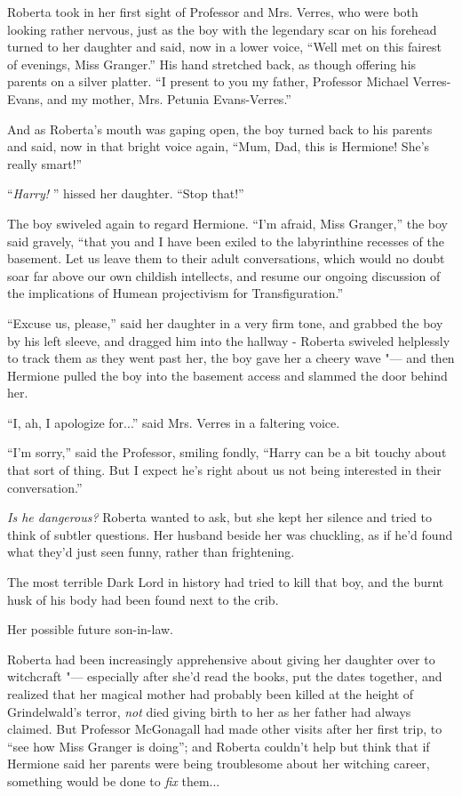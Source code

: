 Roberta took in her first sight of Professor and Mrs. Verres, who were
both looking rather nervous, just as the boy with the legendary scar on
his forehead turned to her daughter and said, now in a lower voice,
``Well met on this fairest of evenings, Miss Granger.'' His hand
stretched back, as though offering his parents on a silver platter. ``I
present to you my father, Professor Michael Verres-Evans, and my mother,
Mrs. Petunia Evans-Verres.''

And as Roberta's mouth was gaping open, the boy turned back to his
parents and said, now in that bright voice again, ``Mum, Dad, this is
Hermione! She's really smart!''

``\emph{Harry!} '' hissed her daughter. ``Stop that!''

The boy swiveled again to regard Hermione. ``I'm afraid, Miss Granger,''
the boy said gravely, ``that you and I have been exiled to the
labyrinthine recesses of the basement. Let us leave them to their adult
conversations, which would no doubt soar far above our own childish
intellects, and resume our ongoing discussion of the implications of
Humean projectivism for Transfiguration.''

``Excuse us, please,'' said her daughter in a very firm tone, and
grabbed the boy by his left sleeve, and dragged him into the hallway -
Roberta swiveled helplessly to track them as they went past her, the boy
gave her a cheery wave "--- and then Hermione pulled the boy into the
basement access and slammed the door behind her.

``I, ah, I apologize for...'' said Mrs. Verres in a faltering
voice.

``I'm sorry,'' said the Professor, smiling fondly, ``Harry can be a bit
touchy about that sort of thing. But I expect he's right about us not
being interested in their conversation.''

\emph{Is he dangerous?} Roberta wanted to ask, but she kept her silence
and tried to think of subtler questions. Her husband beside her was
chuckling, as if he'd found what they'd just seen funny, rather than
frightening.

The most terrible Dark Lord in history had tried to kill that boy, and
the burnt husk of his body had been found next to the crib.

Her possible future son-in-law.

Roberta had been increasingly apprehensive about giving her daughter
over to witchcraft "--- especially after she'd read the books, put the
dates together, and realized that her magical mother had probably been
killed at the height of Grindelwald's terror, \emph{not} died giving
birth to her as her father had always claimed. But Professor McGonagall
had made other visits after her first trip, to ``see how Miss Granger is
doing''; and Roberta couldn't help but think that if Hermione said her
parents were being troublesome about her witching career, something
would be done to \emph{fix} them...


